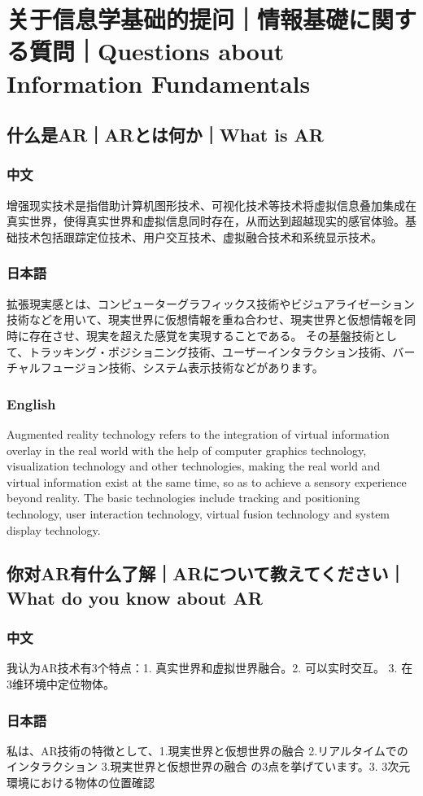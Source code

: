 \documentclass[lang=cn,11pt,a4paper]{elegantpaper}
\begin{document}
\section{关于信息学基础的提问｜情報基礎に関する質問｜Questions about Information Fundamentals}
\subsection{什么是AR｜ARとは何か｜What is AR}
\subsubsection{中文}
增强现实技术是指借助计算机图形技术、可视化技术等技术将虚拟信息叠加集成在真实世界，使得真实世界和虚拟信息同时存在，从而达到超越现实的感官体验。基础技术包括跟踪定位技术、用户交互技术、虚拟融合技术和系统显示技术。
\subsubsection{日本語}
拡張現実感とは、コンピューターグラフィックス技術やビジュアライゼーション技術などを用いて、現実世界に仮想情報を重ね合わせ、現実世界と仮想情報を同時に存在させ、現実を超えた感覚を実現することである。 その基盤技術として、トラッキング・ポジショニング技術、ユーザーインタラクション技術、バーチャルフュージョン技術、システム表示技術などがあります。
\subsubsection{English}
Augmented reality technology refers to the integration of virtual information overlay in the real world with the help of computer graphics technology, visualization technology and other technologies, making the real world and virtual information exist at the same time, so as to achieve a sensory experience beyond reality. The basic technologies include tracking and positioning technology, user interaction technology, virtual fusion technology and system display technology.

\subsection{你对AR有什么了解｜ARについて教えてください｜What do you know about AR}
\subsubsection{中文}
我认为AR技术有3个特点：1. 真实世界和虚拟世界融合。2. 可以实时交互。 3. 在3维环境中定位物体。
\subsubsection{日本語}
私は、AR技術の特徴として、1.現実世界と仮想世界の融合 2.リアルタイムでのインタラクション 3.現実世界と仮想世界の融合 の3点を挙げています。3. 3次元環境における物体の位置確認
\end{document}
